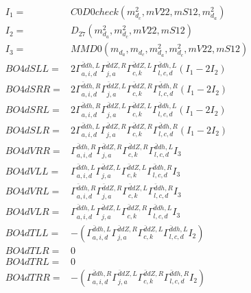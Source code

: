 \documentclass[A4,landscape]{article}
\begin{document}
\begin{align} 
I_1 = & C0D0check(m^2_{d_{{c}}}, mV22, mS12, m^2_{d_{{a}}}) \\ 
I_2 = & D_{27}(m^2_{d_{{a}}}, m^2_{d_{{c}}}, mV22, mS12) \\ 
I_3 = & MMD0(m_{d_{{a}}}, m_{d_{{c}}}, m^2_{d_{{a}}}, m^2_{d_{{c}}}, mV22, mS12) \\ 
  BO4dSLL= & 2  \Gamma^{\bar{d}d h ,L}_{a, i, d} \Gamma^{\bar{d}d Z ,R}_{j, a} \Gamma^{\bar{d}d Z ,L}_{c, k} \Gamma^{\bar{d}d h ,L}_{l, c, d} (I_1 - 2 I_2) \\ 
  BO4dSRR= & 2  \Gamma^{\bar{d}d h ,R}_{a, i, d} \Gamma^{\bar{d}d Z ,L}_{j, a} \Gamma^{\bar{d}d Z ,R}_{c, k} \Gamma^{\bar{d}d h ,R}_{l, c, d} (I_1 - 2 I_2) \\ 
  BO4dSRL= & 2  \Gamma^{\bar{d}d h ,R}_{a, i, d} \Gamma^{\bar{d}d Z ,L}_{j, a} \Gamma^{\bar{d}d Z ,L}_{c, k} \Gamma^{\bar{d}d h ,L}_{l, c, d} (I_1 - 2 I_2) \\ 
  BO4dSLR= & 2  \Gamma^{\bar{d}d h ,L}_{a, i, d} \Gamma^{\bar{d}d Z ,R}_{j, a} \Gamma^{\bar{d}d Z ,R}_{c, k} \Gamma^{\bar{d}d h ,R}_{l, c, d} (I_1 - 2 I_2) \\ 
  BO4dVRR= &  \Gamma^{\bar{d}d h ,R}_{a, i, d} \Gamma^{\bar{d}d Z ,R}_{j, a} \Gamma^{\bar{d}d Z ,R}_{c, k} \Gamma^{\bar{d}d h ,L}_{l, c, d} I_3 \\ 
  BO4dVLL= &  \Gamma^{\bar{d}d h ,L}_{a, i, d} \Gamma^{\bar{d}d Z ,L}_{j, a} \Gamma^{\bar{d}d Z ,L}_{c, k} \Gamma^{\bar{d}d h ,R}_{l, c, d} I_3 \\ 
  BO4dVRL= &  \Gamma^{\bar{d}d h ,R}_{a, i, d} \Gamma^{\bar{d}d Z ,R}_{j, a} \Gamma^{\bar{d}d Z ,L}_{c, k} \Gamma^{\bar{d}d h ,R}_{l, c, d} I_3 \\ 
  BO4dVLR= &  \Gamma^{\bar{d}d h ,L}_{a, i, d} \Gamma^{\bar{d}d Z ,L}_{j, a} \Gamma^{\bar{d}d Z ,R}_{c, k} \Gamma^{\bar{d}d h ,L}_{l, c, d} I_3 \\ 
  BO4dTLL= & -( \Gamma^{\bar{d}d h ,L}_{a, i, d} \Gamma^{\bar{d}d Z ,R}_{j, a} \Gamma^{\bar{d}d Z ,L}_{c, k} \Gamma^{\bar{d}d h ,L}_{l, c, d} I_2) \\ 
  BO4dTLR= & 0 \\ 
  BO4dTRL= & 0 \\ 
  BO4dTRR= & -( \Gamma^{\bar{d}d h ,R}_{a, i, d} \Gamma^{\bar{d}d Z ,L}_{j, a} \Gamma^{\bar{d}d Z ,R}_{c, k} \Gamma^{\bar{d}d h ,R}_{l, c, d} I_2) \\ 
\end{align} 
\end{document}
